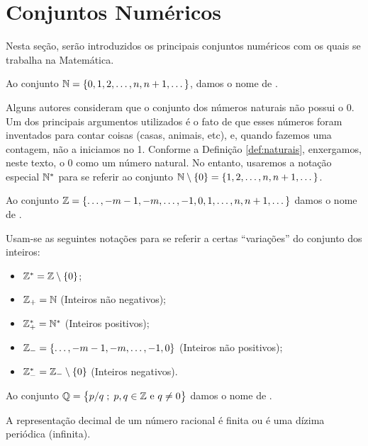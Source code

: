 \section{Conjuntos Numéricos}

Nesta seção, serão introduzidos os principais conjuntos numéricos com os quais se trabalha na Matemática.

\begin{definition}
\label{def:naturais}
Ao conjunto $\mathbb{N} = \left\{ 0, 1, 2, \dots , n, n+1, \dots\right\}$, damos o nome de .
\end{definition}

Alguns autores consideram que o conjunto dos números naturais não possui o 0.
Um dos principais argumentos utilizados é o fato de que esses números foram inventados para contar coisas (casas, animais, etc), e, quando fazemos uma contagem, não a iniciamos no 1.
Conforme a Definição \ref{def:naturais}, enxergamos, neste texto, o 0 como um número natural. No entanto, usaremos a notação especial $\mathbb{N}^*$ para se referir ao conjunto $\mathbb{N} \setminus \left\{ 0\right\} = \left\{ 1, 2, \dots, n, n+1, \dots\right\}$.


\begin{definition}
Ao conjunto $\mathbb{Z} =\left\{ \dots , -m -1, -m, \dots, -1, 0, 1,  \dots , n, n+1, \dots\right\}$ damos o nome de . 
\end{definition}

\noindent Usam-se as seguintes notações para se referir a certas ``variações'' do conjunto dos inteiros:

\begin{itemize}
	\item $\mathbb{Z}^\ast = \mathbb{Z} \setminus \left\{ 0\right\}$; 
	\item $\mathbb{Z}_+ = \mathbb{N}$ (Inteiros não negativos); 
	\item $\mathbb{Z}^\ast_+ =\mathbb{N} ^\ast$ (Inteiros positivos); 
	\item $\mathbb{Z}_- =\left\{ \dots , -m -1, -m, \dots, -1, 0\right\}$ (Inteiros não positivos); 
	\item $\mathbb{Z}_-^\ast =\mathbb{Z}_- \setminus \left\{ 0\right\}$ (Inteiros negativos).
\end{itemize}

\begin{definition}
Ao conjunto $\mathbb{Q} = \left\{ p/q \;;\; p, q \in \mathbb{Z} \text{ e } q \neq 0\right\}$ damos o nome de .
\end{definition}

\begin{remark}
A representação decimal de um número racional é finita ou é uma dízima periódica (infinita).
\end{remark}

